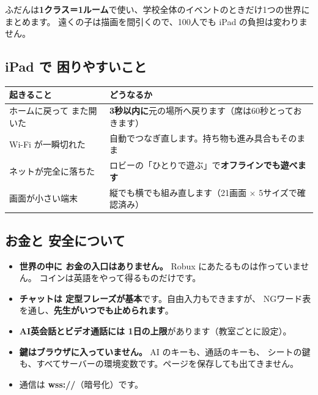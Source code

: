 \documentclass[a4paper,10.5pt]{article}
\begin{document}
ふだんは\textbf{1クラス＝1ルーム}で使い、学校全体のイベントのときだけ1つの世界にまとめます。
遠くの子は描画を間引くので、100人でも iPad の負担は変わりません。

\subsection{iPad で 困りやすいこと}

\begin{center}
\small
\begin{tabular}{@{}p{} p{}@{}}
\toprule
\textbf{起きること} & \textbf{どうなるか} \\
\midrule
ホームに戻って また開いた & \textbf{3秒以内に}元の場所へ戻ります（席は60秒とっておきます） \\
Wi-Fi が一瞬切れた & 自動でつなぎ直します。持ち物も進み具合もそのまま \\
ネットが完全に落ちた & ロビーの「ひとりで遊ぶ」で\textbf{オフラインでも遊べます} \\
画面が小さい端末 & 縦でも横でも組み直します（21画面 × 5サイズで確認済み） \\
\bottomrule
\end{tabular}
\end{center}

\subsection{お金と 安全について}

\begin{itemize}[leftmargin=16pt, itemsep=2pt]
  \item \textbf{世界の中に お金の入口はありません。} Robux にあたるものは作っていません。
        コインは英語をやって得るものだけです。
  \item \textbf{チャットは 定型フレーズが基本}です。自由入力もできますが、
        NGワード表を通し、\textbf{先生がいつでも止められます}。
  \item \textbf{AI英会話とビデオ通話には 1日の上限}があります（教室ごとに設定）。
  \item \textbf{鍵はブラウザに入っていません。} AI のキーも、通話のキーも、
        シートの鍵も、すべてサーバーの環境変数です。ページを保存しても出てきません。
  \item 通信は \textbf{wss://}（暗号化）です。
\end{itemize}

\clearpage

\end{document}
